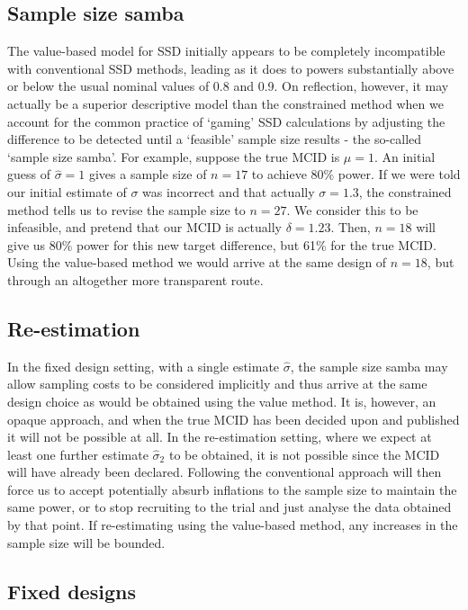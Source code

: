 \documentclass[sagev]{sagej}
\begin{document}
\subsection{Sample size samba}

The value-based model for SSD initially appears to be completely incompatible with conventional SSD methods, leading as it does to powers substantially above or below the usual nominal values of 0.8 and 0.9. On reflection, however, it may actually be a superior descriptive model than the constrained method when we account for the common practice of `gaming' SSD calculations by adjusting the difference to be detected until a `feasible' sample size results - the so-called `sample size samba'. For example, suppose the true MCID is $\mu = 1$. An initial guess of $\hat{\sigma} = 1$ gives a sample size of $n = 17$ to achieve 80\% power. If we were told our initial estimate of $\sigma$ was incorrect and that actually $\sigma = 1.3$, the constrained method tells us to revise the sample size to $n = 27$. We consider this to be infeasible, and pretend that our MCID is actually $\delta = 1.23$. Then, $n = 18$ will give us 80\% power for this new target difference, but 61\% for the true MCID. Using the value-based method we would arrive at the same design of $n = 18$, but through an altogether more transparent route.

\subsection{Re-estimation}

In the fixed design setting, with a single estimate $\hat{\sigma}$, the sample size samba may allow sampling costs to be considered implicitly and thus arrive at the same design choice as would be obtained using the value method. It is, however, an opaque approach, and when the true MCID has been decided upon and published it will not be possible at all. In the re-estimation setting, where we expect at least one further estimate $\hat{\sigma}_2$ to be obtained, it is not possible since the MCID will have already been declared. Following the conventional approach will then force us to accept potentially absurb inflations to the sample size to maintain the same power, or to stop recruiting to the trial and just analyse the data obtained by that point. If re-estimating using the value-based method, any increases in the sample size will be bounded.

\subsection{Fixed designs}
\end{document}
